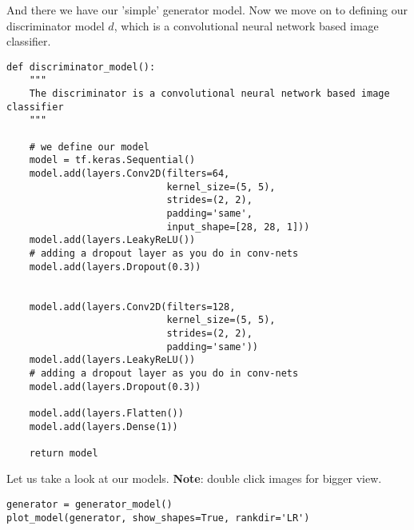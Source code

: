 \documentclass[%
oneside,                 %
final,                   %
10pt]{article}
\begin{document}
And there we have our 'simple' generator model. Now we move on to defining our
discriminator model $d$, which is a convolutional neural network based image
classifier.































\begin{verbatim}
def discriminator_model():
    """
    The discriminator is a convolutional neural network based image classifier
    """

    # we define our model
    model = tf.keras.Sequential()
    model.add(layers.Conv2D(filters=64,
                            kernel_size=(5, 5),
                            strides=(2, 2),
                            padding='same',
                            input_shape=[28, 28, 1]))
    model.add(layers.LeakyReLU())
    # adding a dropout layer as you do in conv-nets
    model.add(layers.Dropout(0.3))


    model.add(layers.Conv2D(filters=128,
                            kernel_size=(5, 5),
                            strides=(2, 2),
                            padding='same'))
    model.add(layers.LeakyReLU())
    # adding a dropout layer as you do in conv-nets
    model.add(layers.Dropout(0.3))

    model.add(layers.Flatten())
    model.add(layers.Dense(1))

    return model

\end{verbatim}


Let us take a look at our models. \textbf{Note}: double click images for bigger view.




\begin{verbatim}
generator = generator_model()
plot_model(generator, show_shapes=True, rankdir='LR')

\end{verbatim}
\end{document}
